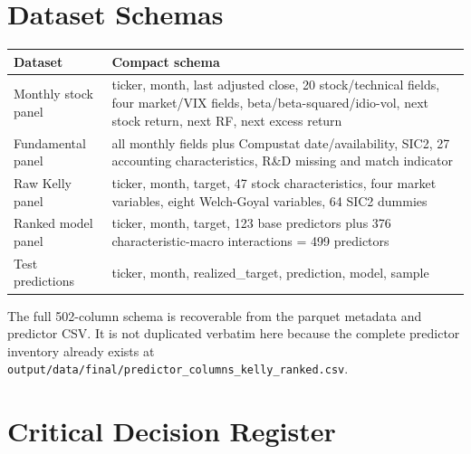 \documentclass[
  11pt,
  a4paper]{article}
\newcounter{none} %
\begin{document}
\section{Dataset Schemas}\label{app-schemas}

{\def\LTcaptype{none} %
\begin{longtable}[]{@{}
  >{\raggedright\arraybackslash}p{}
  >{\raggedright\arraybackslash}p{}@{}}
\toprule\noalign{}
\begin{minipage}[b]{\linewidth}\raggedright
Dataset
\end{minipage} & \begin{minipage}[b]{\linewidth}\raggedright
Compact schema
\end{minipage} \\
\midrule\noalign{}
\endhead
\bottomrule\noalign{}
\endlastfoot
Monthly stock panel & ticker, month, last adjusted close, 20
stock/technical fields, four market/VIX fields,
beta/beta-squared/idio-vol, next stock return, next RF, next excess
return \\
Fundamental panel & all monthly fields plus Compustat date/availability,
SIC2, 27 accounting characteristics, R\&D missing and match indicator \\
Raw Kelly panel & ticker, month, target, 47 stock characteristics, four
market variables, eight Welch-Goyal variables, 64 SIC2 dummies \\
Ranked model panel & ticker, month, target, 123 base predictors plus 376
characteristic-macro interactions = 499 predictors \\
Test predictions & ticker, month, realized\_\allowbreak{}target, prediction, model,
sample \\
\end{longtable}
}

The full 502-column schema is recoverable from the parquet metadata and
predictor CSV. It is not duplicated verbatim here because the complete
predictor inventory already exists at
\texttt{output/data/final/predictor\_\allowbreak{}columns\_\allowbreak{}kelly\_\allowbreak{}ranked.csv}.

\section{Critical Decision Register}\label{app-decisions}
\end{document}
